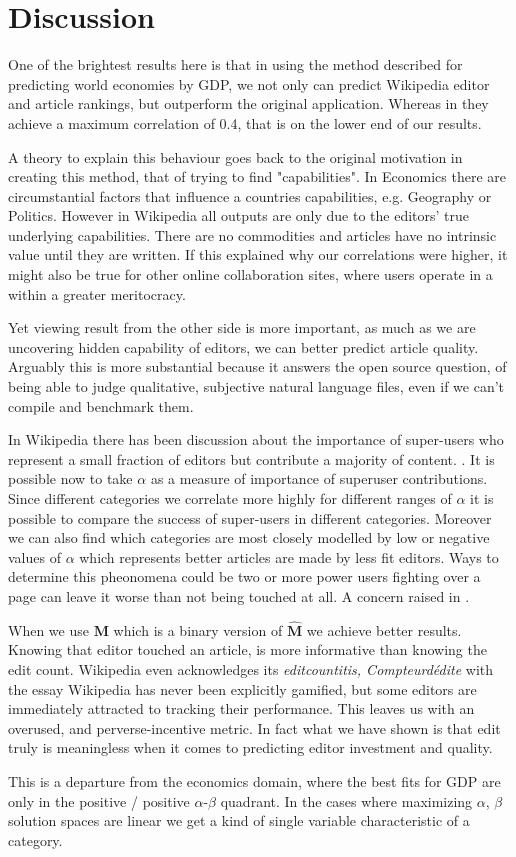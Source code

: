 \section{Discussion}

One of the brightest results here is that in using the method described for predicting world economies by GDP, we not only can predict Wikipedia editor and article rankings, but outperform the original application. Whereas in \cite{caldarelli2012network} they achieve a maximum correlation of 0.4, that is on the lower end of our results. 

A theory to explain this behaviour goes back to the original motivation in creating this method, that of trying to find "capabilities". In Economics there are circumstantial factors that influence a countries capabilities, e.g. Geography or Politics. However in Wikipedia all outputs are only due to the editors' true underlying capabilities. There are no commodities and articles have no intrinsic value until they are written. If this explained why our correlations were higher, it might also be true for other online collaboration sites, where users operate in a within a greater meritocracy.

Yet viewing result from the other side is more important, as much as we are uncovering hidden capability of editors, we can better predict article quality. Arguably this is more substantial because it answers the open source question, of being able to judge qualitative, subjective natural language files, even if we can't compile and benchmark them.   

In Wikipedia there has been discussion about the importance of super-users who represent a small fraction of editors but contribute a majority of content. \cite{website:wikinewsreporter}. It is possible now to take $\alpha$ as a measure of importance of superuser contributions. Since different categories we correlate more highly for different ranges of $\alpha$ it is possible to compare the success of super-users in different categories. Moreover we can also find which categories are most closely modelled by low or negative values of $\alpha$ which represents better articles are made by less fit editors. Ways to determine this pheonomena could be two or more power users fighting over a page can leave it worse than not being touched at all. A concern raised in \cite{halfaker2013}.  
 
 
When we use $\mathbf{M}$ which is a binary version of $\mathbf{\hat{M}}$ we achieve better results. Knowing that editor touched an article, is more informative than knowing the edit count.  Wikipedia even acknowledges its {\it editcountitis, Compteurdédite} with the essay \cite{editcountitis}
Wikipedia has never been explicitly gamified, but some editors are immediately attracted to tracking their performance. This leaves us with an overused, and perverse-incentive metric. In fact what we have shown is that edit truly is meaningless when it comes to predicting editor investment and quality.



This is a departure from the economics domain, where the best fits for GDP are only in the positive / positive $\alpha$-$\beta$ quadrant.
In the cases where maximizing $\alpha$, $\beta$ solution spaces are linear we get a kind of single variable characteristic of a category. 

